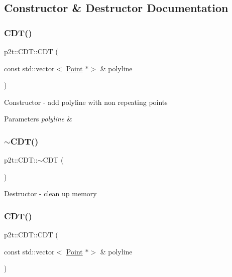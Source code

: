 \subsection{Constructor \& Destructor Documentation}
\mbox{\label{classp2t_1_1CDT_a985f59dc7a62e2ca567f23b663713fe5}} 
\subsubsection{\texorpdfstring{C\+D\+T()}{CDT()}\hspace{0.1cm}{\footnotesize\ttfamily [1/2]}}
{\footnotesize\ttfamily p2t\+::\+C\+D\+T\+::\+C\+DT (\begin{DoxyParamCaption}\item[{const std\+::vector$<$ \hyperlink{structp2t_1_1Point}{Point} $\ast$$>$ \&}]{polyline }\end{DoxyParamCaption})}

Constructor -\/ add polyline with non repeating points


\begin{DoxyParams}{Parameters}
{\em polyline} & \\
\hline
\end{DoxyParams}
\mbox{\label{classp2t_1_1CDT_af1b16e2c9ad6d145f953ddbe721c7cb4}} 
\subsubsection{\texorpdfstring{$\sim$\+C\+D\+T()}{~CDT()}\hspace{0.1cm}{\footnotesize\ttfamily [1/2]}}
{\footnotesize\ttfamily p2t\+::\+C\+D\+T\+::$\sim$\+C\+DT (\begin{DoxyParamCaption}{ }\end{DoxyParamCaption})}

Destructor -\/ clean up memory \mbox{\label{classp2t_1_1CDT_a985f59dc7a62e2ca567f23b663713fe5}} 
\subsubsection{\texorpdfstring{C\+D\+T()}{CDT()}\hspace{0.1cm}{\footnotesize\ttfamily [2/2]}}
{\footnotesize\ttfamily p2t\+::\+C\+D\+T\+::\+C\+DT (\begin{DoxyParamCaption}\item[{const std\+::vector$<$ \hyperlink{structp2t_1_1Point}{Point} $\ast$$>$ \&}]{polyline }\end{DoxyParamCaption})}

